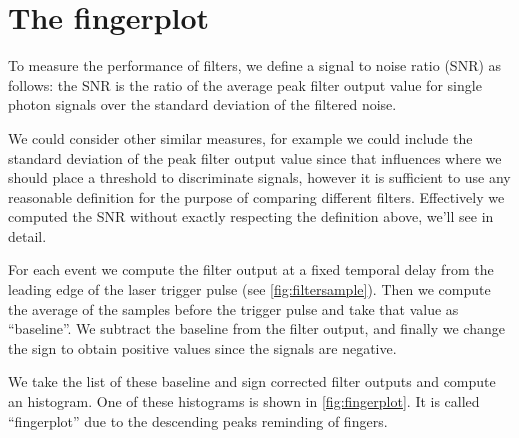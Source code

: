 \section{The fingerplot}
\label{sec:fingerplot}

To measure the performance of filters, we define a signal to noise ratio (SNR)
as follows: the SNR is the ratio of the average peak filter output value for
single photon signals over the standard deviation of the filtered noise.

We could consider other similar measures, for example we could include the
standard deviation of the peak filter output value since that influences where
we should place a threshold to discriminate signals, however it is sufficient
to use any reasonable definition for the purpose of comparing different
filters. Effectively we computed the SNR without exactly respecting the
definition above, we'll see in detail.

For each event we compute the filter output at a fixed temporal delay from the
leading edge of the laser trigger pulse (see \autoref{fig:filtersample}).
Then we compute the average of the samples before the trigger pulse and take
that value as ``baseline''. We subtract the baseline from the filter output,
and finally we change the sign to obtain positive values since the signals are
negative.

\begin{figure}
    

\end{figure}

We take the list of these baseline and sign corrected filter outputs and
compute an histogram. One of these histograms is shown in
\autoref{fig:fingerplot}. It is called ``fingerplot'' due to the descending
peaks reminding of fingers.

\begin{figure}
    

\end{figure}

